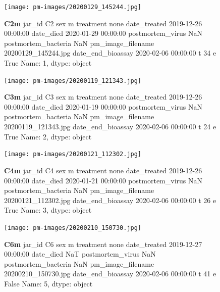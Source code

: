 \begin{figure}[h!]
\centering
\texttt{[image: pm-images/20200129\_145244.jpg]}
\caption{\textbf{C2m} jar\_id                                  C2
sex                                      m
treatment                             none
date\_treated           2019-12-26 00:00:00
date\_died              2020-01-29 00:00:00
postmortem\_virus                       NaN
postmortem\_bacteria                    NaN
pm\_image\_filename      20200129\_145244.jpg
date\_end\_bioassay      2020-02-06 00:00:00
t                                       34
e                                     True
Name: 1, dtype: object}
\end{figure}
\clearpage

\begin{figure}[h!]
\centering
\texttt{[image: pm-images/20200119\_121343.jpg]}
\caption{\textbf{C3m} jar\_id                                  C3
sex                                      m
treatment                             none
date\_treated           2019-12-26 00:00:00
date\_died              2020-01-19 00:00:00
postmortem\_virus                       NaN
postmortem\_bacteria                    NaN
pm\_image\_filename      20200119\_121343.jpg
date\_end\_bioassay      2020-02-06 00:00:00
t                                       24
e                                     True
Name: 2, dtype: object}
\end{figure}
\clearpage

\begin{figure}[h!]
\centering
\texttt{[image: pm-images/20200121\_112302.jpg]}
\caption{\textbf{C4m} jar\_id                                  C4
sex                                      m
treatment                             none
date\_treated           2019-12-26 00:00:00
date\_died              2020-01-21 00:00:00
postmortem\_virus                       NaN
postmortem\_bacteria                    NaN
pm\_image\_filename      20200121\_112302.jpg
date\_end\_bioassay      2020-02-06 00:00:00
t                                       26
e                                     True
Name: 3, dtype: object}
\end{figure}
\clearpage

\begin{figure}[h!]
\centering
\texttt{[image: pm-images/20200210\_150730.jpg]}
\caption{\textbf{C6m} jar\_id                                  C6
sex                                      m
treatment                             none
date\_treated           2019-12-27 00:00:00
date\_died                              NaT
postmortem\_virus                       NaN
postmortem\_bacteria                    NaN
pm\_image\_filename      20200210\_150730.jpg
date\_end\_bioassay      2020-02-06 00:00:00
t                                       41
e                                    False
Name: 5, dtype: object}
\end{figure}
\clearpage

